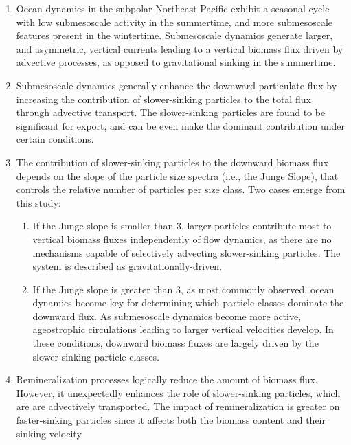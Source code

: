 \documentclass[article,linenumbers]{agujournal2019}
\begin{document}
	\begin{enumerate}
		\item Ocean dynamics in the subpolar Northeast Pacific exhibit a seasonal cycle with low submesoscale activity in the summertime, and more submesoscale features present in the wintertime. Submesoscale dynamics generate larger, and asymmetric, vertical currents leading to a vertical biomass flux driven by advective processes, as opposed to gravitational sinking in the summertime.

		\item Submesoscale dynamics generally enhance the downward particulate flux by increasing the contribution of slower-sinking particles to the total flux through advective transport.   The  slower-sinking particles are found to be significant for export, and can be even make the dominant contribution under certain conditions.
		\item The contribution of slower-sinking particles to the downward biomass flux depends on the slope of the particle size spectra (i.e., the Junge Slope), that controls the relative number of particles per size class. Two cases emerge from this study:
		\begin{enumerate}
			\item If the Junge slope is smaller than 3, larger particles contribute most to vertical biomass fluxes independently of flow dynamics, as there are no mechanisms capable of selectively advecting slower-sinking particles. The system is described as gravitationally-driven.
			\item If the Junge slope is greater than 3, as most commonly observed, ocean dynamics become key for determining which particle classes dominate the downward flux. As submesoscale dynamics become more active, ageostrophic circulations leading to larger vertical velocities develop. In these conditions, downward biomass fluxes are largely driven by the slower-sinking particle classes.
		\end{enumerate}
		\item Remineralization processes  logically reduce the amount of biomass flux. However, it unexpectedly enhances the role of slower-sinking particles, which are are advectively transported. The impact of remineralization  is greater on faster-sinking particles since it affects both the biomass content and their sinking velocity.
	\end{enumerate}
\end{document}
